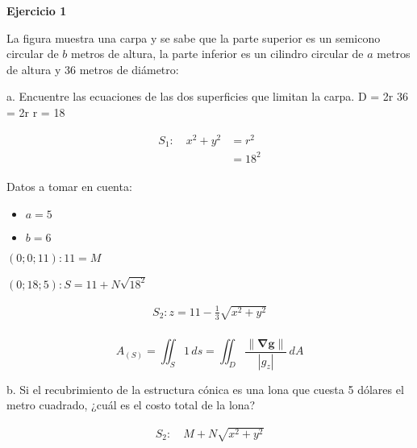 \documentclass{article}
\begin{document}
\larger[1.9] 

\textbf{Ejercicio 1}\par


La figura muestra una carpa y se sabe que la parte superior es un semicono circular de $b$ metros de altura, la parte inferior es un cilindro circular de $a$ metros de altura y 36 metros de diámetro:\par

a. Encuentre las ecuaciones de las dos superficies que limitan la carpa.
D = 2r
36 = 2r
r = 18 \par


\begin{subequations}
\begin{align}
S_1: \quad x^2 + y^2 &= r^2 \\
\phantom{S_1:} &= 18^2
\end{align}
\end{subequations}

Datos a tomar en cuenta:
\begin{itemize}
    \item $a = 5$
    \item $b = 6$
\end{itemize}

$(0; 0; 11):   11 = M$ \par
$(0; 18; 5):   S = 11 + N \sqrt{18^2}$ \par

\begin{subequations}
\begin{align}
S_2: z = 11- \frac{1}{3} \sqrt{x^2 + y^2}\\
\end{align}
\end{subequations}

$$A_(S) = \iint_S 1 \, ds = \iint_D \frac{\|\mathbf{\nabla g}\|}{| g_z|} \, dA $$ \par
b. Si el recubrimiento de la estructura cónica es una lona que cuesta 5 dólares el metro cuadrado, ¿cuál es el costo total de la lona? \par

\begin{subequations}
\begin{align}
S_2: \quad M + N \sqrt{x^2 + y^2}
\end{align}
\end{subequations}
\end{document}
